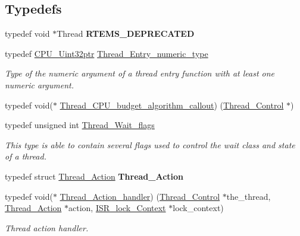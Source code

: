 \subsection*{Typedefs}
\begin{DoxyCompactItemize}
\item 
\mbox{\label{group__RTEMSScoreThread_ga7f0af080cbd9a675e6620229577bd498}} 
typedef void $\ast$Thread {\bfseries R\+T\+E\+M\+S\+\_\+\+D\+E\+P\+R\+E\+C\+A\+T\+ED}
\item 
typedef \mbox{\hyperlink{group__RTEMSScoreCPUARM_ga9fca17f81f850e128fcc8ed5b87ff2ab}{C\+P\+U\+\_\+\+Uint32ptr}} \mbox{\hyperlink{group__RTEMSScoreThread_gab56e437830bb9a4af5b27ac7ec503b6a}{Thread\+\_\+\+Entry\+\_\+numeric\+\_\+type}}
\begin{DoxyCompactList}\small\item\em Type of the numeric argument of a thread entry function with at least one numeric argument. \end{DoxyCompactList}\item 
typedef void($\ast$ \mbox{\hyperlink{group__RTEMSScoreThread_ga2f15cbe9653e5bfcb2595454e9ffd14a}{Thread\+\_\+\+C\+P\+U\+\_\+budget\+\_\+algorithm\+\_\+callout}}) (\mbox{\hyperlink{struct__Thread__Control}{Thread\+\_\+\+Control}} $\ast$)
\item 
typedef unsigned int \mbox{\hyperlink{group__RTEMSScoreThread_ga9a047ae9c77bc90a258203d4f2cc57db}{Thread\+\_\+\+Wait\+\_\+flags}}
\begin{DoxyCompactList}\small\item\em This type is able to contain several flags used to control the wait class and state of a thread. \end{DoxyCompactList}\item 
\mbox{\label{group__RTEMSScoreThread_ga5e09db039db106f22c17c0b8e4bd748c}} 
typedef struct \mbox{\hyperlink{structThread__Action}{Thread\+\_\+\+Action}} {\bfseries Thread\+\_\+\+Action}
\item 
typedef void($\ast$ \mbox{\hyperlink{group__RTEMSScoreThread_ga3ed91c6271fd8090120d824662541c74}{Thread\+\_\+\+Action\+\_\+handler}}) (\mbox{\hyperlink{struct__Thread__Control}{Thread\+\_\+\+Control}} $\ast$the\+\_\+thread, \mbox{\hyperlink{structThread__Action}{Thread\+\_\+\+Action}} $\ast$action, \mbox{\hyperlink{structISR__lock__Context}{I\+S\+R\+\_\+lock\+\_\+\+Context}} $\ast$lock\+\_\+context)
\begin{DoxyCompactList}\small\item\em Thread action handler. \end{DoxyCompactList}\item 

\end{DoxyCompactItemize}
